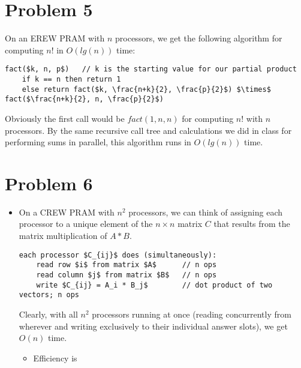 \documentclass{article}
\providecommand{\prob}[1]{\section*{Problem #1}}
\begin{document}
\prob{5}
On an EREW PRAM with $n$ processors, we get the following algorithm for computing $n!$ in $O(lg(n))$ time:\\
\begin{lstlisting}
fact($k, n, p$)   // k is the starting value for our partial product
    if k == n then return 1
    else return fact($k, \frac{n+k}{2}, \frac{p}{2}$) $\times$ fact($\frac{n+k}{2}, n, \frac{p}{2}$)
\end{lstlisting}
Obviously the first call would be $fact(1, n, n)$ for computing $n!$ with $n$ processors. By the same recursive call tree and calculations we did in class for performing sums in parallel, this algorithm runs in $O(lg(n))$ time.

\prob{6}
\begin{itemize}
 \item On a CREW PRAM with $n^2$ processors, we can think of assigning each processor to a unique element of the $n \times n$ matrix $C$ that results from the matrix multiplication of $A*B$.
       \begin{lstlisting}
each processor $C_{ij}$ does (simultaneously):
    read row $i$ from matrix $A$      // n ops
    read column $j$ from matrix $B$   // n ops
    write $C_{ij} = A_i * B_j$        // dot product of two vectors; n ops
 \end{lstlisting}
 Clearly, with all $n^2$ processors running at once (reading concurrently from wherever and writing exclusively to their individual answer slots), we get $O(n)$ time.
 \begin{itemize}
  \item Efficiency is
 \end{itemize}
\end{itemize}
\end{document}
